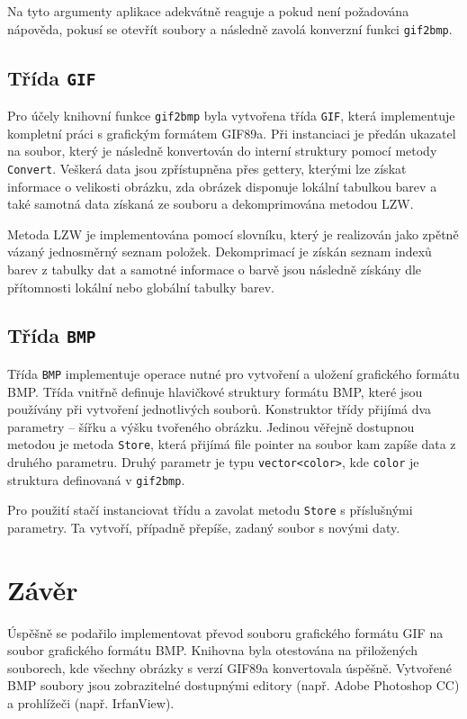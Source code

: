 \documentclass[11pt,a4paper]{article}
\begin{document}
Na tyto argumenty aplikace adekvátně reaguje a pokud není požadována nápověda, pokusí se otevřít soubory a následně zavolá konverzní funkci \texttt{gif2bmp}.

\subsection{Třída \texttt{GIF}}

Pro účely knihovní funkce \texttt{gif2bmp} byla vytvořena třída \texttt{GIF}, která implementuje kompletní práci s grafickým formátem GIF89a. Při instanciaci je předán ukazatel na soubor, který je následně konvertován do interní struktury pomocí metody \texttt{Convert}. Veškerá data jsou zpřístupněna přes gettery, kterými lze získat informace o velikosti obrázku, zda obrázek disponuje lokální tabulkou barev a také samotná data získaná ze souboru a dekomprimována metodou LZW.

Metoda LZW je implementována pomocí slovníku, který je realizován jako zpětně vázaný jednosměrný seznam položek. Dekomprimací je získán seznam indexů barev z tabulky dat a samotné informace o barvě jsou následně získány dle přítomnosti lokální nebo globální tabulky barev.

\subsection{Třída \texttt{BMP}}

Třída \texttt{BMP} implementuje operace nutné pro vytvoření a uložení grafického formátu BMP. Třída vnitřně definuje hlavičkové struktury formátu BMP, které jsou používány při vytvoření jednotlivých souborů. Konstruktor třídy přijímá dva parametry -- šířku a výšku tvořeného obrázku. Jedinou věřejně dostupnou metodou je metoda \texttt{Store}, která přijímá file pointer na soubor kam zapíše data z druhého parametru. Druhý parametr je typu \texttt{vector<color>}, kde \texttt{color} je struktura definovaná v \texttt{gif2bmp}.

Pro použití stačí instanciovat třídu a zavolat metodu \texttt{Store} s příslušnými parametry. Ta vytvoří, případně přepíše, zadaný soubor s novými daty.


\section{Závěr}

Úspěšně se podařilo implementovat převod souboru grafického formátu GIF na soubor grafického formátu BMP. Knihovna byla otestována na přiložených souborech, kde všechny obrázky s verzí GIF89a konvertovala úspěšně. Vytvořené BMP soubory jsou zobrazitelné dostupnými editory (např. Adobe Photoshop CC) a prohlížeči (např. IrfanView).
\end{document}
